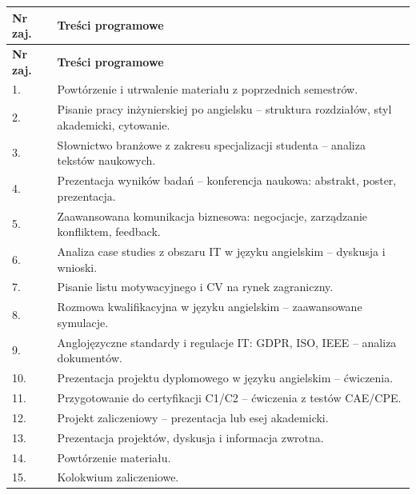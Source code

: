 \documentclass[12pt, a4paper]{article}
\newcommand{\thdrule}{\noalign{\global\setlength{\extrarowheight}{0pt}}}
\newcommand{\thdend}{\noalign{\global\setlength{\extrarowheight}{3pt}}}
\begin{document}
{\scriptsize
\begin{longtable}{m{1.5cm}m{14.5cm}}
\thdrule\toprule
\rowcolor{pjatkRed} {\color{white}\textbf{Nr zaj.}} & {\color{white}\textbf{Treści programowe}} \\
\midrule\thdend
\endfirsthead
\thdrule\toprule
\rowcolor{pjatkRed} {\color{white}\textbf{Nr zaj.}} & {\color{white}\textbf{Treści programowe}} \\
\midrule\thdend
\endhead
  \rowcolor{tableRowLight} 1. & Powtórzenie i utrwalenie materiału z poprzednich semestrów. \\
  \rowcolor{tableRowAlt} 2. & Pisanie pracy inżynierskiej po angielsku – struktura rozdziałów, styl akademicki, cytowanie. \\
  \rowcolor{tableRowLight} 3. & Słownictwo branżowe z zakresu specjalizacji studenta – analiza tekstów naukowych. \\
  \rowcolor{tableRowAlt} 4. & Prezentacja wyników badań – konferencja naukowa: abstrakt, poster, prezentacja. \\
  \rowcolor{tableRowLight} 5. & Zaawansowana komunikacja biznesowa: negocjacje, zarządzanie konfliktem, feedback. \\
  \rowcolor{tableRowAlt} 6. & Analiza case studies z obszaru IT w języku angielskim – dyskusja i wnioski. \\
  \rowcolor{tableRowLight} 7. & Pisanie listu motywacyjnego i CV na rynek zagraniczny. \\
  \rowcolor{tableRowAlt} 8. & Rozmowa kwalifikacyjna w języku angielskim – zaawansowane symulacje. \\
  \rowcolor{tableRowLight} 9. & Anglojęzyczne standardy i regulacje IT: GDPR, ISO, IEEE – analiza dokumentów. \\
  \rowcolor{tableRowAlt} 10. & Prezentacja projektu dyplomowego w języku angielskim – ćwiczenia. \\
  \rowcolor{tableRowLight} 11. & Przygotowanie do certyfikacji C1/C2 – ćwiczenia z testów CAE/CPE. \\
  \rowcolor{tableRowAlt} 12. & Projekt zaliczeniowy – prezentacja lub esej akademicki. \\
  \rowcolor{tableRowLight} 13. & Prezentacja projektów, dyskusja i informacja zwrotna. \\
  \rowcolor{tableRowAlt} 14. & Powtórzenie materiału. \\
  \rowcolor{tableRowLight} 15. & Kolokwium zaliczeniowe. \\
\bottomrule
\end{longtable}}
\end{document}
